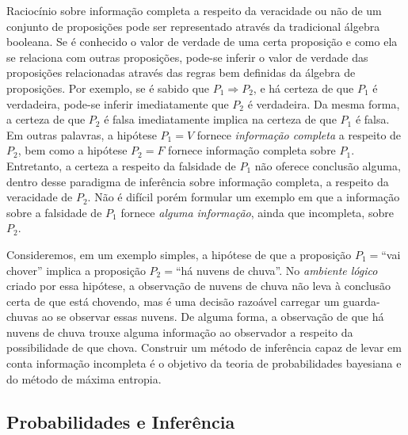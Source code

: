 Raciocínio sobre informação completa a respeito da veracidade ou não de um conjunto de proposições pode ser representado através da tradicional álgebra booleana. Se é conhecido o valor de verdade de uma certa proposição e como ela se relaciona com outras proposições, pode-se inferir o valor de verdade das proposições relacionadas através das regras bem definidas da álgebra de proposições. Por exemplo, se é sabido que $P_{1} \Rightarrow P_{2}$, e há certeza de que $P_{1}$ é verdadeira, pode-se inferir imediatamente que $P_{2}$ é verdadeira. Da mesma forma, a certeza de que $P_{2}$ é falsa imediatamente implica na certeza de que $P_{1}$ é falsa. Em outras palavras, a hipótese $P_{1} = V$ fornece \textit{informação completa} a respeito de $P_{2}$, bem como a hipótese $P_{2} = F$ fornece informação completa sobre $P_1$. Entretanto, a certeza a respeito da falsidade de $P_{1}$ não oferece conclusão alguma, dentro desse paradigma de inferência sobre informação completa, a respeito da veracidade de $P_{2}$. Não é difícil porém formular um exemplo em que a informação sobre a falsidade de $P_{1}$ fornece \textit{alguma informação}, ainda que incompleta, sobre $P_{2}$. 

Consideremos, em um exemplo simples, a hipótese de que a proposição $P_{1} = $``vai chover'' implica a proposição $P_{2} =$``há nuvens de chuva''. No \textit{ambiente lógico} criado por essa hipótese, a observação de nuvens de chuva não leva à conclusão certa de que está chovendo, mas é uma decisão razoável carregar um guarda-chuvas ao se observar essas nuvens. De alguma forma, a observação de que há nuvens de chuva trouxe alguma informação ao observador a respeito da possibilidade de que chova. Construir um método de inferência capaz de levar em conta informação incompleta é o objetivo da teoria de probabilidades bayesiana e do método de máxima entropia. 

\subsection{Probabilidades e Inferência}

